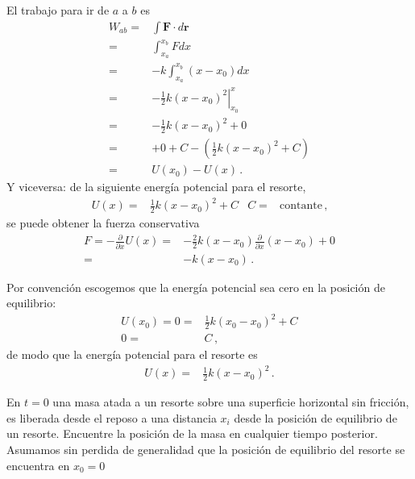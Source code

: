 El trabajo para ir de $a$ a $b$ es
\begin{align}
  W_{ab}=&\int \mathbf{F}\cdot d\mathbf{r}\nonumber\\
  =&\int_{x_a}^{x_b} Fdx\nonumber\\
  =&-k\int_{x_a}^{x_b} (x-x_0)dx\nonumber\\
  =&-\tfrac{1}{2}k \left.
    (x-x_0)^2\right|_{x_0}^x\nonumber\\
  =&-\tfrac{1}{2}k (x-x_0)^2+0\nonumber\\
  =&+0+C-(\tfrac{1}{2}k (x-x_0)^2+C)\nonumber\\
  =&U(x_0)-U(x)\,.
\end{align}
Y viceversa: de la siguiente energía potencial para el resorte,
\begin{align}
  U(x)=&\tfrac{1}{2}k{(x-x_0)^2}+C& C=&\text{contante}\,,
\end{align}
se puede obtener la fuerza conservativa
\begin{align}
  F=-\frac{\partial}{\partial x}U(x)=&-\frac{2}{2}k(x-x_0)\frac{\partial}{\partial x}(x-x_0)+0\nonumber\\
=&-k(x-x_0)\,.
\end{align}

Por convención escogemos que la energía potencial sea cero en la posición de equilibrio:
\begin{align}
  U(x_0)=0=&\tfrac{1}{2}k{(x_0-x_0)^2}+C\nonumber\\
  0=&C\,,
\end{align}
de modo que la energía potencial para el resorte es
\begin{align}
  U(x)=&\tfrac{1}{2}k{(x-x_0)^2}\,.
\end{align}

\example{}
\label{ex:resorte}

En $t=0$ una masa atada a un resorte sobre
una superficie horizontal sin fricción, es
liberada desde el reposo a una distancia $x_i$ desde la posición de
equilibrio de un resorte. Encuentre la posición de la masa en
  cualquier tiempo posterior. Asumamos sin perdida de generalidad que
  la posición de equilibrio del resorte se encuentra en $x_0=0$

